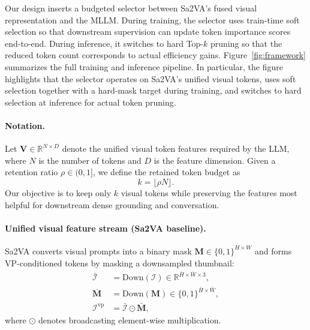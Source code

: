 Our design inserts a budgeted selector between Sa2VA's fused visual representation and the MLLM.
During training, the selector uses train-time soft selection so that downstream supervision can update token importance scores end-to-end.
During inference, it switches to hard Top-$k$ pruning so that the reduced token count corresponds to actual efficiency gains.
Figure~\ref{fig:framework} summarizes the full training and inference pipeline. In particular, the figure highlights that the selector operates on Sa2VA's unified visual tokens, uses soft selection together with a hard-mask target during training, and switches to hard selection at inference for actual token pruning.

\paragraph{Notation.}
Let $\mathbf{V}\in\mathbb{R}^{N\times D}$ denote the unified visual token features required by the LLM, where $N$ is the number of tokens and $D$ is the feature dimension.
Given a retention ratio $\rho\in(0,1]$, we define the retained token budget as
\begin{equation}
k = \lfloor \rho N \rfloor.
\label{eq:method_token_budget}
\end{equation}
Our objective is to keep only $k$ visual tokens while preserving the features most helpful for downstream dense grounding and conversation.

\paragraph{Unified visual feature stream (Sa2VA baseline).}
Sa2VA converts visual prompts into a binary mask $\mathbf{M}\in\{0,1\}^{H\times W}$ and forms VP-conditioned tokens by masking a downsampled thumbnail:
\begin{equation}
\begin{aligned}
\bar{\mathcal{I}} &= \mathrm{Down}(\mathcal{I}) \in \mathbb{R}^{\bar{H}\times\bar{W}\times 3},\\
\bar{\mathbf{M}} &= \mathrm{Down}(\mathbf{M}) \in \{0,1\}^{\bar{H}\times\bar{W}},\\
\mathcal{I}^{\mathrm{vp}} &= \bar{\mathcal{I}} \odot \bar{\mathbf{M}},
\end{aligned}
\label{eq:method_vp_masked_thumb}
\end{equation}
where $\odot$ denotes broadcasting element-wise multiplication.

